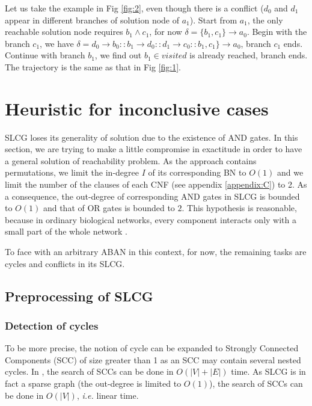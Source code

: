 \documentclass[runningheads]{llncs}
\newcommand{\acm}[3]{#1\rightarrow#2}
\begin{document}
Let us take the example in Fig \ref{fig:2}, even though there is a conflict ($d_0$ and $d_1$ appear in different branches of solution node of $a_1$). 
Start from $a_1$, the only reachable solution node requires $b_1\land c_1$, for now $\delta=\acm{\{b_1,c_1\}}{a_0}{a_1}$.
Begin with the branch $c_1$, we have $\delta=\acm{d_0}{b_0}{b_1}::\acm{b_1}{d_0}{d_1}::\acm{d_1}{c_0}{c_1}::\acm{b_1,c_1\}}{a_0}{a_1}$, branch $c_1$ ends. 
Continue with branch $b_1$, we find out $b_1\in visited$ is already reached, branch ends. 
The trajectory is the same as that in Fig \ref{fig:1}.



\section{Heuristic for inconclusive cases}\label{sect:4}

SLCG loses its generality of solution due to the existence of AND gates. %
In this section, we are trying to make a little compromise in exactitude in order to have a general solution of reachability problem. %
As the approach contains permutations, we limit the in-degree $I$ of its corresponding BN to $O (1)$ and we limit the number of the clauses of each CNF (see appendix \ref{appendix:C}) to 2. 
As a consequence, the out-degree of corresponding AND gates in SLCG is bounded to $O (1)$ and that of OR gates is bounded to $2$. 
This hypothesis is reasonable, because in ordinary biological networks, every component interacts only with a small part of the whole network \cite{akutsu2007control}.

To face with an arbitrary ABAN in this context, for now, the remaining tasks are cycles and conflicts in its SLCG.
\subsection{Preprocessing of SLCG}\label{sectprecond}
\subsubsection{Detection of cycles}
To be more precise, the notion of cycle can be expanded to Strongly Connected Components (SCC) of size greater than 1 as an SCC may contain several nested cycles. 
In \cite{tarjan1972}, the search of SCCs can be done in $O (|V|+|E|)$ time. 
As SLCG is in fact a sparse graph (the out-degree is limited to $O (1)$), the search of SCCs can be done in $O (|V|)$, \textit{i.e.} linear time.
\end{document}
